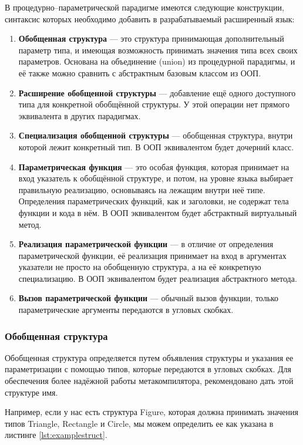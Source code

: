 В процедурно–параметрической парадигме имеются следующие конструкции, синтаксис которых необходимо добавить в разрабатываемый расширенный язык:
\begin{enumerate}
  \item \textbf{Обобщенная структура} --- это структура принимающая дополнительный параметр типа, и имеющая возможность принимать значения типа всех своих параметров. Основана на объединение (union) из процедурной парадигмы, и её также можно сравнить с абстрактным базовым классом из ООП.
  \item \textbf{Расширение обобщенной структуры} --- добавление ещё одного доступного типа для конкретной обобщённой структуры. У этой операции нет прямого эквивалента в других парадигмах.
  \item \textbf{Специализация обобщенной структуры} --- обобщенная структура, внутри которой лежит конкретный тип. В ООП эквивалентом будет дочерний класс.
  \item \textbf{Параметрическая функция} --- это особая функция, которая принимает на вход указатель к обобщённой структуре, и потом, на уровне языка выбирает правильную реализацию, основываясь на лежащим внутри неё типе. Определения параметрических функций, как и заголовки, не содержат тела функции и кода в нём. В ООП эквивалентом будет абстрактный виртуальный метод.
  \item \textbf{Реализация параметрической функции} --- в отличие от определения параметрической функции, её реализация принимает на вход в аргументах указатели не просто на обобщенную структура, а на её конкретную специализацию. В ООП эквивалентом будет реализация абстрактного метода.
  \item \textbf{Вызов параметрической функции} --- обычный вызов функции, только параметрические аргументы передаются в угловых скобках.
\end{enumerate}

\subsubsection{Обобщенная структура}

Обобщенная структура определяется путем объявления структуры и указания ее параметризации с помощью типов, которые передаются в угловых скобках. Для обеспечения более надёжной работы метакомпилятора, рекомендовано дать этой структуре имя.

Например, если у нас есть структура Figure, которая должна принимать значения типов Triangle, Rectangle и Circle, мы можем определить ее как указана в листинге \ref{lst:examplestruct}.

